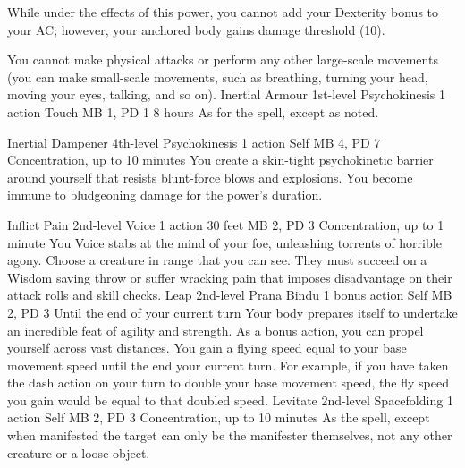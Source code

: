 While under the effects of this power, you cannot add your
Dexterity bonus to your AC; however, your anchored body gains
damage threshold (10).

You cannot make physical attacks or perform any other large-scale
movements (you can make small-scale movements, such as breathing,
turning your head, moving your eyes, talking, and so on).
\DndPowerHeader%
    {Inertial Armour\label{pwr:inertial_armour}}
    {1st-level Psychokinesis}
    {1 action}
    {Touch}
    {MB 1, PD 1}
    {8 hours}
As for the  spell, except
as noted.

\DndPowerHeader%
    {Inertial Dampener\label{pwr:inertial_dampener}}
    {4th-level Psychokinesis}
    {1 action}
    {Self}
    {MB 4, PD 7}
    {Concentration, up to 10 minutes}
You create a skin-tight psychokinetic barrier
around yourself that resists blunt-force blows and explosions.
You become immune to bludgeoning damage for the power's duration.

\DndPowerHeader%
    {Inflict Pain\label{pwr:inflict_pain}}
    {2nd-level Voice}
    {1 action}
    {30 feet}
    {MB 2, PD 3}
    {Concentration, up to 1 minute}
You Voice stabs at the mind of your foe,
unleashing torrents of horrible agony. Choose a creature in
range that you can see. They must succeed on a Wisdom saving
throw or suffer wracking pain that imposes disadvantage on
their attack rolls and skill checks.
\DndPowerHeader%
    {Leap\label{pwr:leap}}
    {2nd-level Prana Bindu}
    {1 bonus action}
    {Self}
    {MB 2, PD 3}
    {Until the end of your current turn}
Your body prepares itself to undertake an
incredible feat of agility and strength. As a bonus action,
you can propel yourself across vast distances. You gain a
flying speed equal to your base movement speed until the end
your current turn. For example, if you have taken the dash
action on your turn to double your base movement speed, the
fly speed you gain would be equal to that doubled speed.
\DndPowerHeader%
    {Levitate\label{pwr:levitate}}
    {2nd-level Spacefolding}
    {1 action}
    {Self}
    {MB 2, PD 3}
    {Concentration, up to 10 minutes}
As the  spell, except when
manifested the target can only be the manifester themselves,
not any other creature or a loose object.

